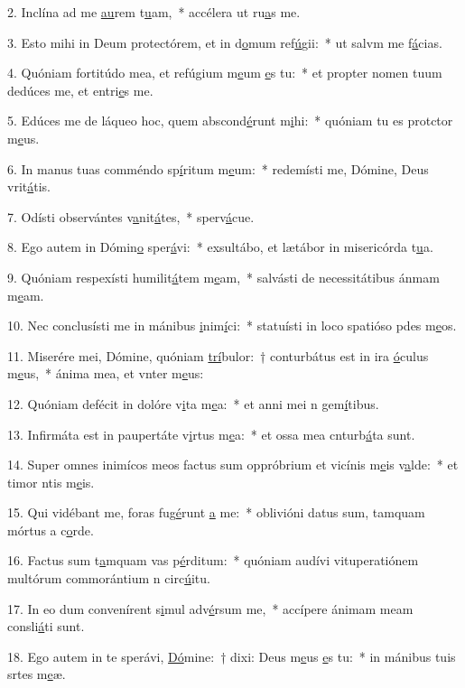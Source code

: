 2. Inclína ad me \uline{au}rem t\uline{u}am,~* accélera ut ru\uline{a}s me.\par 
3. Esto mihi in Deum protectórem, et in d\uline{o}mum ref\uline{ú}gii:~* ut salvm me f\uline{á}cias.\par 
4. Quóniam fortitúdo mea, et refúgium m\uline{e}um \uline{e}s tu:~* et propter nomen tuum dedúces me, et entri\uline{e}s me.\par 
5. Edúces me de láqueo hoc, quem abscond\uline{é}runt m\uline{i}hi:~* quóniam tu es protctor m\uline{e}us.\par 
6. In manus tuas comméndo sp\uline{í}ritum m\uline{e}um:~* redemísti me, Dómine, Deus vrit\uline{á}tis.\par 
7. Odísti observántes v\uline{a}nit\uline{á}tes,~* sperv\uline{á}cue.\par 
8. Ego autem in Dómin\uline{o} sper\uline{á}vi:~* exsultábo, et lætábor in misericórda t\uline{u}a.\par 
9. Quóniam respexísti humilit\uline{á}tem m\uline{e}am,~* salvásti de necessitátibus ánmam m\uline{e}am.\par 
10. Nec conclusísti me in mánibus \uline{i}nim\uline{í}ci:~* statuísti in loco spatióso pdes m\uline{e}os.\par 
11. Miserére mei, Dómine, quóniam \uline{trí}bulor:~† conturbátus est in ira \uline{ó}culus m\uline{e}us,~* ánima mea, et vnter m\uline{e}us:\par 
12. Quóniam defécit in dolóre v\uline{i}ta m\uline{e}a:~* et anni mei n gem\uline{í}tibus.\par 
13. Infirmáta est in paupertáte v\uline{i}rtus m\uline{e}a:~* et ossa mea cnturb\uline{á}ta sunt.\par 
14. Super omnes inimícos meos factus sum oppróbrium et vicínis m\uline{e}is v\uline{a}lde:~* et timor ntis m\uline{e}is.\par 
15. Qui vidébant me, foras fug\uline{é}runt \uline{a} me:~* oblivióni datus sum, tamquam mórtus a c\uline{o}rde.\par 
16. Factus sum t\uline{a}mquam vas p\uline{é}rditum:~* quóniam audívi vituperatiónem multórum commorántium n circ\uline{ú}itu.\par 
17. In eo dum convenírent s\uline{i}mul adv\uline{é}rsum me,~* accípere ánimam meam consli\uline{á}ti sunt.\par 
18. Ego autem in te sperávi, \uline{Dó}mine:~† dixi: Deus m\uline{e}us \uline{e}s tu:~* in mánibus tuis srtes m\uline{e}æ.\par 
